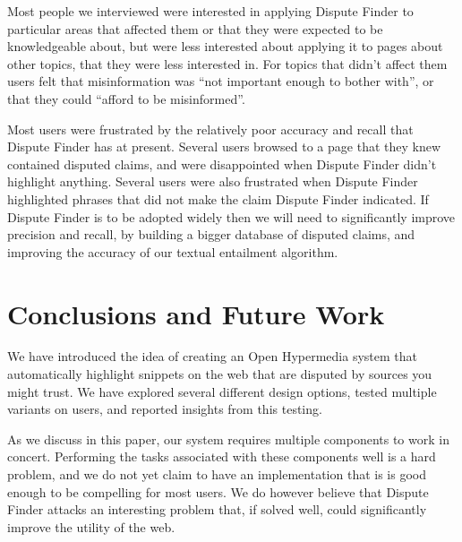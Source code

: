 \documentclass{www2010-submission}
\newcommand{\todo}[1]{}
\begin{document}
Most people we interviewed were interested in applying Dispute Finder to particular areas that affected them or that they were expected to be knowledgeable about, but were less interested about applying it to pages about other topics, that they were less interested in. For topics that didn't affect them users felt that misinformation was ``not important enough to bother with'', or that they could ``afford to be misinformed''.

Most users were frustrated by the relatively poor accuracy and recall that Dispute Finder has at present. Several users browsed to a page that they knew contained disputed claims, and were disappointed when Dispute Finder didn't highlight anything. Several users were also frustrated when Dispute Finder highlighted phrases that did not make the claim Dispute Finder indicated. If Dispute Finder is to be adopted widely then we will need to significantly improve precision and recall, by building a bigger database of disputed claims, and improving the accuracy of our textual entailment algorithm.

\todo{Need to say that the argumentation graph contains all existing claims and that it was a simple ``supports"/``opposes'' graph.}

\todo{Come up with terminology for marking an evidence snippet, and agree on evidence vs source vs article}
\todo{Talk about how the early versions conflated evidence and snippets - and whether it makes sense to distinguish between them}
\todo{Screenshot of the claim graph interface}


\section{Conclusions and Future Work}

We have introduced the idea of creating an Open Hypermedia system that automatically highlight snippets on the web that are disputed by sources you might trust. We have explored several different design options, tested multiple variants on users, and reported insights from this testing.

As we discuss in this paper, our system requires multiple components to work in concert. Performing the tasks associated with these components well is a hard problem, and we do not yet claim to have an implementation that is is good enough to be compelling for most users. We do however believe that Dispute Finder attacks an interesting problem that, if solved well, could significantly improve the utility of the web.
\end{document}
